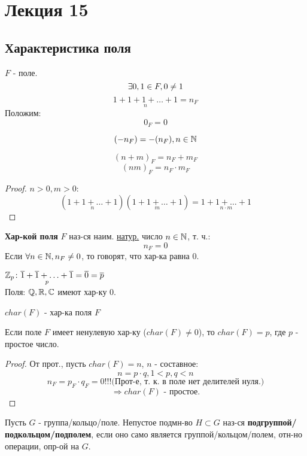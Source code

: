 \section{Лекция 15}
\subsection{Характеристика поля}
$F$ - поле.
\[
\exists 0, 1 \in F, 0 \neq 1 \\
\]
\[
\underset{n}{1 + 1 + 1 + \ldots + 1} = n_F
\]
Положим: \\ 
\[
  0_F = 0
\]

\[
  (-n_F) = -(n_F), n \in \mathbb{N}
\]
\begin{lemma}
\[
  (n + m)_F = n_F + m_F
\]
\[
  (nm)_F = n_F \cdot m_F
\]
\end{lemma}
\begin{proof}
  $n > 0, m > 0$:
  \[
    (\underset{n}{1 + 1 + \ldots + 1})(\underset{m}{1 + 1 + \ldots + 1}) = \underset{n \cdot m}{1 + 1 + \ldots + 1}
  \]
\end{proof}
\begin{definition}
\textbf{Хар-кой поля} $F$ наз-ся наим. \underline{натур.} число $n \in \mathbb{N}$, т. ч.:
\[
n_F = 0
\]
Если $\forall n \in \mathbb{N}, n_F \neq 0$, то говорят, что хар-ка равна $0$.
\end{definition}
\begin{example}
$\mathbb{Z}_p \colon \underset{p}{\overline{1} + \overline{1} + \ldots + \overline{1}} = \overline{0} = \overline{p}$ \\
Поля: $\mathbb{Q}, \mathbb{R}, \mathbb{C}$ имеют хар-ку 0.
\end{example}
\begin{symb}
$char(F)$ - хар-ка поля $F$
\end{symb}
\begin{statement}
 Если поле $F$ имеет ненулевую хар-ку ($char(F) \neq 0$), то $char(F) = p$, где $p$ - простое число.
\end{statement}
\begin{proof}
От прот., пусть $char(F) = n$, $n$ - составное:
\[
n = p \cdot q, 1 < p, q < n
\]
\[
n_F = p_F \cdot q_F = 0!!! \text{(Прот-е, т. к. в поле нет делителей нуля.)}
\]
\[
\Rightarrow char(F) \text{ - простое.}
\]
\end{proof}
\begin{definition}
Пусть $G$ - группа/кольцо/поле. Непустое подмн-во $H \subset G$ наз-ся \textbf{подгруппой/подкольцом/подполем}, если оно само является группой/кольцом/полем, отн-но операции, опр-ой на $G$.
\end{definition}

